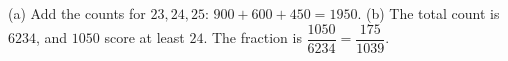 (a) Add the counts for $23,24,25$: $900+600+450=\boxed{1950}$. (b) The total count is $6234$, and $1050$ score at least $24$. The fraction is $\dfrac{1050}{6234}=\boxed{\dfrac{175}{1039}}$.

